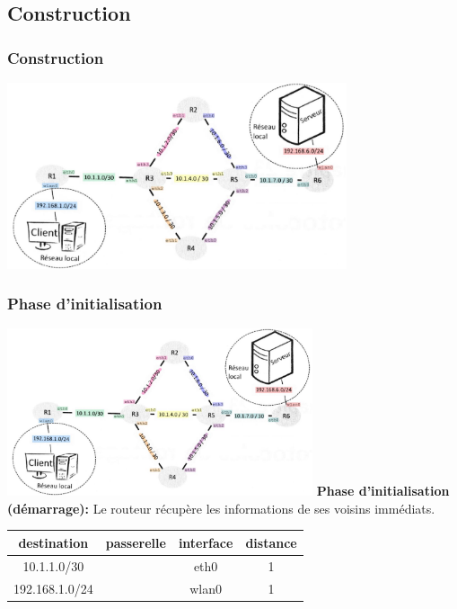 \documentclass[svgnames,11pt]{beamer}
\begin{document}
\subsection{Construction}
\begin{frame}
    \frametitle{Construction}

    \begin{center}
    \centering
    \includegraphics[width=10cm]{ressources/reseau.png}
    \label{IMG}
    \end{center}

\end{frame}

\begin{frame}
    \frametitle{Phase d'initialisation}
        \includegraphics[width=9cm]{ressources/reseau.png}
\textbf{Phase d'initialisation (démarrage):} Le routeur récupère les informations de ses voisins immédiats.

        \begin{center}
    \begin{tabular}{|*{4}{c|}}
        \hline
        destination    & passerelle & interface & distance \\
        \hline
        10.1.1.0/30    &            & eth0      & 1        \\
        \hline
        192.168.1.0/24 &            & wlan0     & 1        \\
        \hline
    \end{tabular}
\end{center}
\end{frame}
\end{document}
